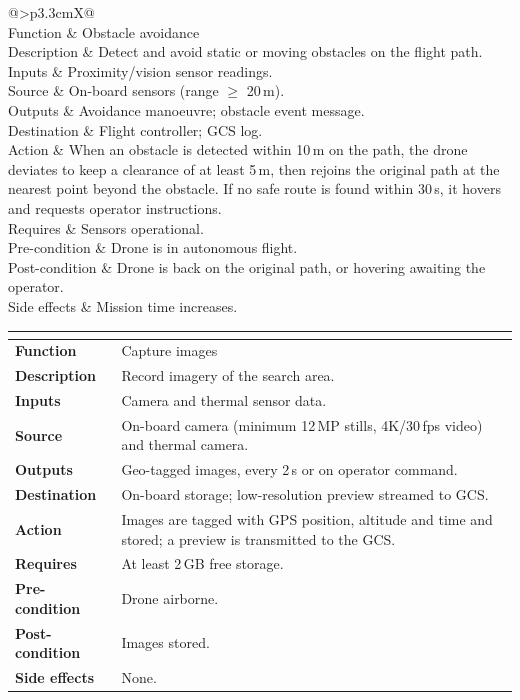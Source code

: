 \documentclass[11pt,a4paper]{article}
\makeatletter
\newcommand{\spec}[2]{\noindent\begin{tabularx}{\linewidth}{@{}>{\bfseries}p{3.3cm}X@{}}\toprule
\multicolumn{2}{@{}l}{\textbf{#1}}\\\midrule #2 \bottomrule\end{tabularx}\par\medskip}
\makeatother
\begin{document}
\spec{Drone/SR/02 -- Avoid obstacles}{
Function & Obstacle avoidance \\
Description & Detect and avoid static or moving obstacles on the flight path. \\
Inputs & Proximity/vision sensor readings. \\
Source & On-board sensors (range $\ge$ 20\,m). \\
Outputs & Avoidance manoeuvre; obstacle event message. \\
Destination & Flight controller; GCS log. \\
Action & When an obstacle is detected within 10\,m on the path, the drone deviates to keep a clearance
of at least 5\,m, then rejoins the original path at the nearest point beyond the obstacle. If no safe
route is found within 30\,s, it hovers and requests operator instructions. \\
Requires & Sensors operational. \\
Pre-condition & Drone is in autonomous flight. \\
Post-condition & Drone is back on the original path, or hovering awaiting the operator. \\
Side effects & Mission time increases. \\
}

\spec{Drone/SR/03 -- Capture images}{
Function & Capture images \\
Description & Record imagery of the search area. \\
Inputs & Camera and thermal sensor data. \\
Source & On-board camera (minimum 12\,MP stills, 4K/30\,fps video) and thermal camera. \\
Outputs & Geo-tagged images, every 2\,s or on operator command. \\
Destination & On-board storage; low-resolution preview streamed to GCS. \\
Action & Images are tagged with GPS position, altitude and time and stored; a preview is transmitted to the GCS. \\
Requires & At least 2\,GB free storage. \\
Pre-condition & Drone airborne. \\
Post-condition & Images stored. \\
Side effects & None. \\
}
\end{document}
